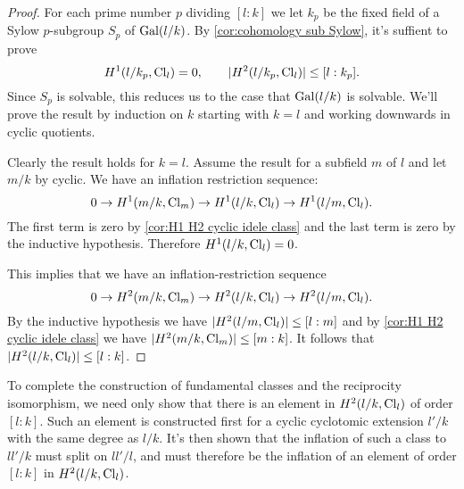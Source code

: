 \begin{proof}
	For each prime number $p$ dividing $[l:k]$ we let $k_p$ be the fixed
	field of a Sylow $p$-subgroup $S_p$ of $\mathrm{Gal}(l/k)$.
	By \ref{cor:cohomology sub Sylow}, it's suffient to prove
	\[
		H^1(l/k_p, \mathrm{Cl}_{l}) = 0, \qquad
		|H^2(l/k_p, \mathrm{Cl}_{l})| \le [l:k_p].
	\]
	Since $S_p$ is solvable, this reduces us to the case that $\mathrm{Gal}(l/k)$ is solvable.
	We'll prove the result by induction on $k$ starting with $k=l$ and working downwards
	in cyclic quotients.

	Clearly the result holds for $k=l$.
	Assume the result for a subfield $m$ of $l$ and let $m/k$ by cyclic.
	We have an inflation restriction sequence:
	\[
		0 \to H^1(m/k, \mathrm{Cl}_{m}) \to H^1(l/k, \mathrm{Cl}_{l}) \to H^1(l/m,\mathrm{Cl}_{l}).
	\]
	The first term is zero by \ref{cor:H1 H2 cyclic idele class} and the last term is zero by
	the inductive hypothesis.
	Therefore $H^1(l/k,\mathrm{Cl}_l)=0$.

	This implies that we have an inflation-restriction sequence
	\[
		0 \to H^2(m/k, \mathrm{Cl}_m) \to H^2(l/k, \mathrm{Cl}_l) \to H^2(l/m,\mathrm{Cl}_l).
	\]
	By the inductive hypothesis we have $|H^2(l/m,\mathrm{Cl}_l)| \le [l:m]$
	and by \ref{cor:H1 H2 cyclic idele class} we have $|H^2(m/k, \mathrm{Cl}_m)| \le [m : k]$.
	It follows that $|H^2(l/k,\mathrm{Cl}_l)| \le [l : k]$.
\end{proof}


To complete the construction of fundamental classes and the reciprocity isomorphism,
we need only show that there is an element in $H^2(l/k,\mathrm{Cl}_l)$ of order $[l:k]$.
Such an element is constructed first for a cyclic cyclotomic extension $l'/k$ with the same degree
as $l/k$.
It's then shown that the inflation of such a class to $ll'/k$ must split on $ll'/l$,
and must therefore be the inflation of an element of order $[l:k]$ in $H^2(l/k,\mathrm{Cl}_l)$.
